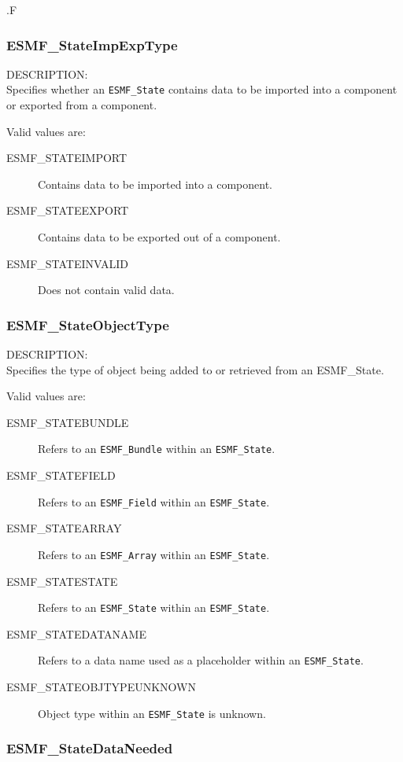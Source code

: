 .F%

\subsubsection{ESMF\_StateImpExpType}

{\sf DESCRIPTION:\\}
Specifies whether an {\tt ESMF\_State} contains data to be imported
into a component or exported from a component. 

Valid values are:
\begin{description}
   \item [ESMF\_STATEIMPORT] 
         Contains data to be imported into a component.
   \item [ESMF\_STATEEXPORT]
         Contains data to be exported out of a component.
   \item [ESMF\_STATEINVALID]
         Does not contain valid data.
\end{description}

\subsubsection{ESMF\_StateObjectType}

{\sf DESCRIPTION:\\}
Specifies the type of object being added to or retrieved from an
{ESMF\_State.}

Valid values are:
\begin{description}
   \item [ESMF\_STATEBUNDLE] 
         Refers to an {\tt ESMF\_Bundle} within an {\tt ESMF\_State}.
   \item [ESMF\_STATEFIELD]
         Refers to an {\tt ESMF\_Field} within an {\tt ESMF\_State}.
   \item [ESMF\_STATEARRAY]
         Refers to an {\tt ESMF\_Array} within an {\tt ESMF\_State}.
   \item [ESMF\_STATESTATE]
         Refers to an {\tt ESMF\_State} within an {\tt ESMF\_State}.
   \item [ESMF\_STATEDATANAME]
         Refers to a data name used as a placeholder within 
         an {\tt ESMF\_State}.
   \item [ESMF\_STATEOBJTYPEUNKNOWN]
         Object type within an {\tt ESMF\_State} is unknown.
\end{description}

\subsubsection{ESMF\_StateDataNeeded}


